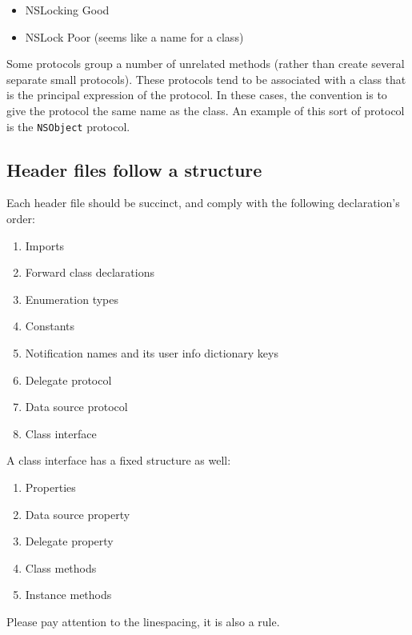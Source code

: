 \documentclass[10pt]{extarticle}
\newcommand{\inlinecode}[1]{{\textcolor{TundoraColor}{\texttt{#1}}}}
\begin{document}
\begin{itemize}
\item NSLocking	\tabto{3cm} Good
\item NSLock \tabto{3cm} Poor (seems like a name for a class)
\end{itemize}

Some protocols group a number of unrelated methods (rather than create several separate small protocols). These protocols tend to be associated with a class that is the principal expression of the protocol. In these cases, the convention is to give the protocol the same name as the class. An example of this sort of protocol is the \inlinecode{NSObject} protocol.


\subsection{Header files follow a structure}

Each header file should be succinct, and comply with the following declaration's order:

\begin{enumerate}
\item Imports
\item Forward class declarations
\item Enumeration types
\item Constants
\item Notification names and its user info dictionary keys
\item Delegate protocol
\item Data source protocol
\item Class interface
\end{enumerate}

A class interface has a fixed structure as well:

\begin{enumerate}
\item Properties
\item Data source property
\item Delegate property
\item Class methods
\item Instance methods
\end{enumerate}

Please pay attention to the linespacing, it is also a rule.
\end{document}

